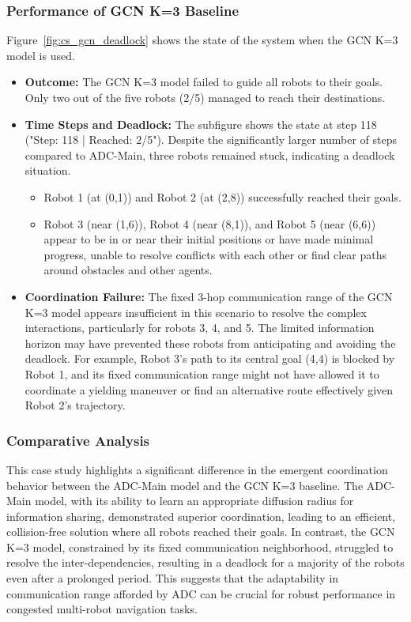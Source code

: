 \subsubsection{Performance of GCN K=3 Baseline}
\label{subsubsec:gcn_performance}
Figure~\ref{fig:cs_gcn_deadlock} shows the state of the system when the GCN K=3 model is used.
\begin{itemize}
    \item \textbf{Outcome:} The GCN K=3 model failed to guide all robots to their goals. Only two out of the five robots (2/5) managed to reach their destinations.
    \item \textbf{Time Steps and Deadlock:} The subfigure shows the state at step 118 ("Step: 118 | Reached: 2/5"). Despite the significantly larger number of steps compared to ADC-Main, three robots remained stuck, indicating a deadlock situation.
        \begin{itemize}
            \item Robot 1 (at (0,1)) and Robot 2 (at (2,8)) successfully reached their goals.
            \item Robot 3 (near (1,6)), Robot 4 (near (8,1)), and Robot 5 (near (6,6)) appear to be in or near their initial positions or have made minimal progress, unable to resolve conflicts with each other or find clear paths around obstacles and other agents.
        \end{itemize}
    \item \textbf{Coordination Failure:} The fixed 3-hop communication range of the GCN K=3 model appears insufficient in this scenario to resolve the complex interactions, particularly for robots 3, 4, and 5. The limited information horizon may have prevented these robots from anticipating and avoiding the deadlock. For example, Robot 3's path to its central goal (4,4) is blocked by Robot 1, and its fixed communication range might not have allowed it to coordinate a yielding maneuver or find an alternative route effectively given Robot 2's trajectory.
\end{itemize}

\subsubsection{Comparative Analysis}
This case study highlights a significant difference in the emergent coordination behavior between the ADC-Main model and the GCN K=3 baseline. The ADC-Main model, with its ability to learn an appropriate diffusion radius for information sharing, demonstrated superior coordination, leading to an efficient, collision-free solution where all robots reached their goals. In contrast, the GCN K=3 model, constrained by its fixed communication neighborhood, struggled to resolve the inter-dependencies, resulting in a deadlock for a majority of the robots even after a prolonged period. This suggests that the adaptability in communication range afforded by ADC can be crucial for robust performance in congested multi-robot navigation tasks.



